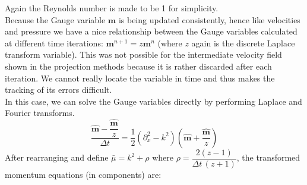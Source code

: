 Again the Reynolds number is made to be 1 for simplicity.\\
Because the Gauge variable $\textbf{m}$ is being updated consistently, hence like velocities and pressure we have a nice relationship between the Gauge variables calculated at different time iterations: $\textbf{m}^{n+1} = z \textbf{m}^n$ (where $z$ again is the discrete Laplace transform variable). This was not possible for the intermediate velocity field shown in the projection methods because it is rather discarded after each iteration. We cannot really locate the variable in time and thus makes the tracking of its errors difficult.\\

In this case, we can solve the Gauge variables directly by performing Laplace and Fourier transforms.\\
\begin{equation*}
\dfrac{\hat{\textbf{m}} - \dfrac{\hat{\textbf{m}}}{z}}{\Delta t} = \dfrac{1}{2}\left(\partial_x^2 - k^2 \right)
\left(\hat{\textbf{m}} + \dfrac{\hat{\textbf{m}}}{z} \right)
\end{equation*}
After rearranging and define $\bar{\mu} = k^2 + \rho$ where $\rho = \dfrac{2(z-1)}{\Delta t \,(z+1)}$, the transformed momentum equations (in components) are:

